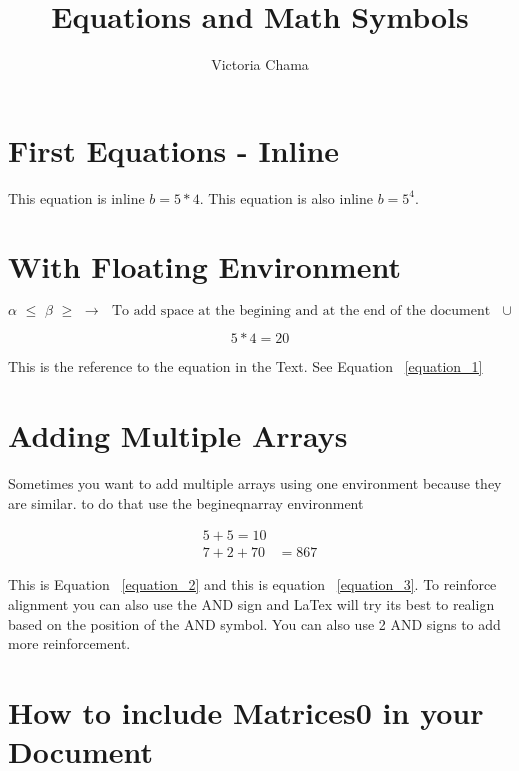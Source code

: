 \documentclass{article}
\title{Equations and Math Symbols}
\author{Victoria Chama}
\begin{document}
	\maketitle
	
	\section{First Equations - Inline}
	
	This equation is inline $b = 5*4$.
	This equation is also inline $b = 5^4$.
	
	\section{With Floating Environment}
	

	\begin{equation}
	\label{equation_1}
	\alpha \,\, \leq  \,\, \beta \,\, \geq \,\, \rightarrow \,\, \text{ To add space at the begining and at the end of the document } \,\, \cup 
	\end{equation}
	
	
	\begin{equation*}
	5*4 = 20
	\end{equation*}
	
	This is the reference to the equation in the Text. See Equation ~\ref{equation_1}
	
	\section{Adding Multiple Arrays}
	Sometimes you want to add multiple arrays using one environment because they are similar. to do that use the begin{eqnarray} environment
	 
	\begin{eqnarray}
	\label{equation_2}
	5 + 5= 10 \\ 
	\label{equation_3}
	7 + 2 + 70 &= 867
	\end{eqnarray}
	
	This is Equation ~\ref{equation_2} and this is equation ~\ref{equation_3}. To reinforce alignment you can also use the AND sign and LaTex will try its best to realign based on the position of the AND symbol. You can also use 2 AND signs to add more reinforcement. 
	
	\section{How to include Matrices0 in your Document}
	
\end{document}
